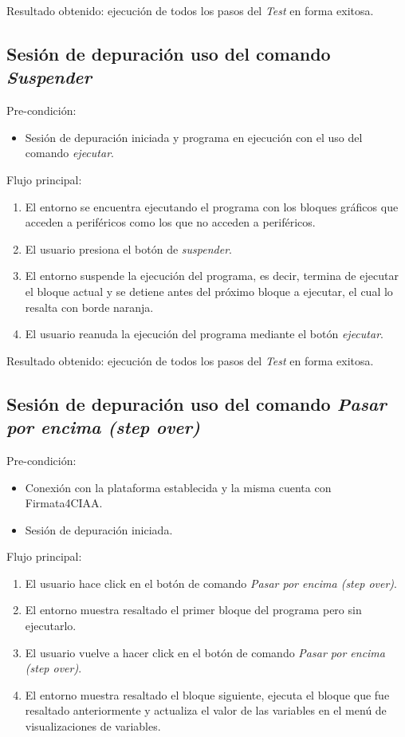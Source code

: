 Resultado obtenido: ejecución de todos los pasos del \emph{Test} en forma exitosa. 

\subsection{Sesión de depuración uso del comando \emph{Suspender}}
Pre-condición:
\begin{itemize}
	\item Sesión de depuración iniciada y programa en ejecución con el uso del comando \emph{ejecutar}.
\end{itemize}

Flujo principal:
\begin{enumerate}
	\item
	El entorno se encuentra ejecutando el programa con los bloques gráficos que acceden a periféricos como los que no acceden a periféricos.
	\item
	El usuario presiona el botón de \emph{suspender}.
	\item
	El entorno suspende la ejecución del programa, es decir, termina de ejecutar el bloque actual y se detiene antes del próximo bloque a ejecutar, el cual lo resalta con borde naranja.
	\item
	El usuario reanuda la ejecución del programa mediante el botón \emph{ejecutar}.
\end{enumerate}

Resultado obtenido: ejecución de todos los pasos del \emph{Test} en forma exitosa.

\subsection{Sesión de depuración uso del comando \emph{Pasar por encima (step over)}}
Pre-condición:
\begin{itemize}
		\item Conexión con la plataforma establecida y la misma cuenta con Firmata4CIAA.
		\item Sesión de depuración iniciada. 
\end{itemize}

Flujo principal:
\begin{enumerate}
	\item
	El usuario hace click en el botón de comando \emph{Pasar por encima (step over)}.
	\item
	El entorno muestra resaltado el primer bloque del programa pero sin ejecutarlo.
	\item
	El usuario vuelve a hacer click en el botón de comando \emph{Pasar por encima (step over)}.
	\item
	El entorno muestra resaltado el bloque siguiente, ejecuta el bloque que fue resaltado anteriormente y actualiza el valor de las variables en el menú de visualizaciones de variables.
\end{enumerate}


